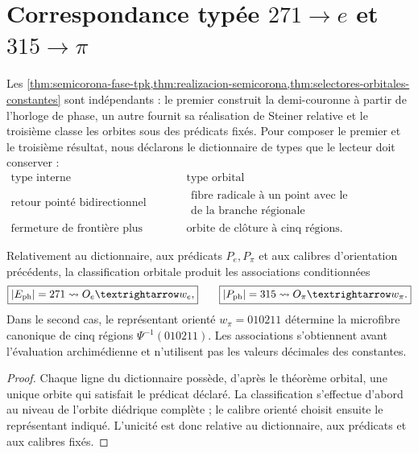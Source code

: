 \section{Correspondance typée \texorpdfstring{\(271\to e\) et
\(315\to\pi\)}{271 vers e et 315 vers pi}}

Les
\cref{thm:semicorona-fase-tpk,thm:realizacion-semicorona,thm:selectores-orbitales-constantes}
sont indépendants : le premier construit
la demi-couronne à partir de l'horloge de phase, un autre fournit sa réalisation de
Steiner relative et le troisième classe les orbites sous des prédicats fixés. Pour
composer le premier et le troisième résultat, nous déclarons le
dictionnaire de types que le lecteur doit conserver :
\[
\begin{array}{c|c}
\text{type interne}&\text{type orbital}\\
\hline
\text{retour pointé bidirectionnel}&
\begin{gathered}
\text{fibre radicale à un point avec le recensement}\\
\text{de la branche régionale}
\end{gathered}\\
\text{fermeture de frontière plus latérale}&
\text{orbite de clôture à cinq régions}.
\end{array}
\]

\begin{corollary}
\label{cor:lectores-enteros-relativos}
Relativement au dictionnaire, aux prédicats \(P_e,P_\pi\) et aux
calibres d'orientation précédents, la classification orbitale produit les
associations conditionnées
\[
 \boxed{|E_{\rm ph}|=271\rightsquigarrow \mathcal O_e
        \longrightarrow w_e,}
 \qquad
 \boxed{|P_{\rm ph}|=315\rightsquigarrow \mathcal O_\pi
        \longrightarrow w_\pi.}
\]
Dans le second cas, le représentant orienté \(w_\pi=010211\) détermine la
microfibre canonique de cinq régions \(\Psi^{-1}(010211)\). Les associations
s'obtiennent avant l'évaluation archimédienne et n'utilisent pas les valeurs
décimales des constantes.
\end{corollary}

\begin{proof}
Chaque ligne du dictionnaire possède, d'après le théorème orbital, une unique orbite qui
satisfait le prédicat déclaré. La classification s'effectue d'abord au
niveau de l'orbite diédrique complète ; le calibre orienté choisit ensuite le
représentant indiqué. L'unicité est donc relative au dictionnaire,
aux prédicats et aux calibres fixés.
\end{proof}

